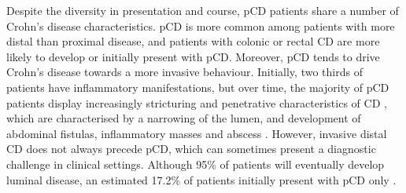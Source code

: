 Despite the diversity in presentation and course, pCD patients share a number of Crohn's disease characteristics. pCD is  more common among patients with more distal than proximal disease, and patients with colonic or rectal CD are more likely to develop or initially present with pCD. Moreover, pCD tends to drive Crohn's disease towards a more invasive behaviour. Initially, two thirds of patients have inflammatory manifestations, but over time, the majority of pCD patients display increasingly stricturing and penetrative characteristics of CD \cite{Peyrin-Biroulet2010-mf,Scharl2017-sp}, which are characterised by a narrowing of the lumen, and development of abdominal fistulas, inflammatory masses and abscess \cite{Gasche2000-qh}.  However, invasive distal CD does not always precede pCD, which can sometimes present a diagnostic challenge in clinical settings. Although 95\% of patients will eventually develop luminal disease, an estimated 17.2\% of patients initially present with pCD only \cite{Eglinton2012-hh}. \\


